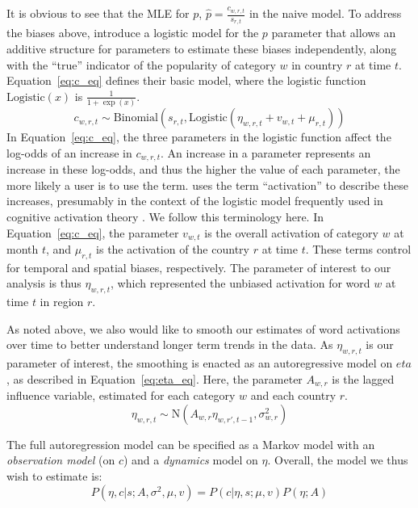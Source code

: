 It is obvious to see that the MLE for $p$, $\hat{p} = \frac{c_{w,r,t}}{s_{r,t}}$ in the naive model.  To address the biases above, \cite{eisenstein_diffusion_2014} introduce a logistic model for the $p$ parameter that allows an additive structure for parameters to estimate these biases independently, along with the ``true'' indicator of the popularity of category $w$ in country $r$ at time $t$. Equation~\ref{eq:c_eq} defines their basic model, where the logistic function $\text{Logistic}(x)$ is $\frac{1}{1 + \exp(x)}$.
\begin{equation}
	c_{w,r,t} \sim \mathrm{Binomial}(s_{r,t}, \mathrm{Logistic}(\eta_{w,r,t} + v_{w,t} + \mu_{r,t})) \label{eq:c_eq} 
\end{equation}
In Equation~\ref{eq:c_eq}, the three parameters in the logistic function affect the log-odds of an increase in $c_{w,r,t}$.  An increase in a parameter represents an increase in these log-odds, and thus the higher the value of each parameter, the more likely a user is to use the term.  \cite{eisenstein_diffusion_2014} uses the term ``activation'' to describe these increases, presumably in the context of the logistic model frequently used in cognitive activation theory \cite{}. We follow this terminology here.  In Equation~\ref{eq:c_eq}, the parameter $v_{w,t}$ is the overall activation of category $w$ at month $t$, and $\mu_{r,t}$ is the activation of the country $r$ at time $t$.  These terms control for temporal and spatial biases, respectively.  The parameter of interest to our analysis is thus $\eta_{w,r,t}$, which represented the unbiased activation for word $w$ at time $t$ in region $r$. 

As noted above, we also would like to smooth our estimates of word activations over time to better understand longer term trends in the data. As $\eta_{w,r,t}$ is our parameter of interest, the smoothing is enacted as an autoregressive model on $eta$, as described in Equation~\ref{eq:eta_eq}. Here, the parameter $A_{w,r}$ is the lagged influence variable, estimated for each category $w$ and each country $r$.
\begin{equation}
	\eta_{w,r,t} \sim \mathrm{N}( A_{w,r} \eta_{w,r',t-1}, \sigma^2_{w,r}) \label{eq:eta_eq}
\end{equation}

The full autoregression model can be specified as a Markov model with an \emph{observation model} (on $c$) and a \emph{dynamics}  model on $\eta$. Overall, the model we thus wish to estimate is:
\begin{equation}
	P(\eta,c|s; A, \sigma^2,\mu,v) = P(c | \eta, s; \mu, v) P(\eta; A)
\end{equation}

